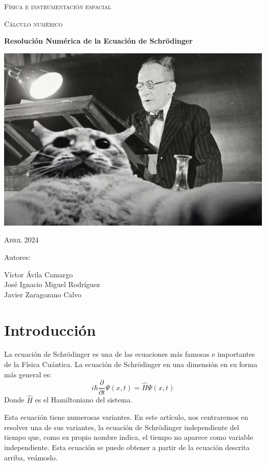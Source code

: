 \documentclass[12pt]{article}
\begin{document}
\begin{titlepage}
\begin{center}
{\scshape\huge Física e instrumentación espacial \par}
\vspace{1cm}
{\scshape\Large Cálculo numérico \par}
\vspace{1cm}
{\textbf{{\Huge Resolución Numérica de la Ecuación de Schrödinger}} \par}
\vspace{1.5cm}
{\includegraphics[scale=0.8]{portada.jpg}\par}
\vspace{1cm}
{\scshape\Large Abril 2024 \par}
\vspace{1.5cm}
\end{center}
\begin{flushleft}
{\Large Autores: \par}
{\Large 
Víctor Ávila Camargo\\
José Ignacio Miguel Rodríguez\\
Javier Zaragozano Calvo \par
}
\end{flushleft}
\end{titlepage}

\tableofcontents
\newpage	

\section{Introducción}
La ecuación de Schrödinger es una de las ecuaciones más famosas
e importantes de la Física Cuántica. La ecuación de Schrödinger en una dimensión en su forma más general es: 
\begin{equation}
i\hbar \frac{\partial}{\partial t}\Psi (x,t)=\hat{H} \Psi (x,t)
\end{equation}
Donde $\hat{H}$ es el Hamiltoniano del sistema. \\
\par
Esta ecuación tiene numerosas variantes. En este artículo, nos 
centraremos en resolver una de sus variantes, la ecuación de Schrödinger
independiente del tiempo que, como su propio nombre indica, el tiempo
no aparece como variable independiente. Esta ecuación se puede obtener a partir de la ecuación descrita arriba, veámoslo.
\end{document}
